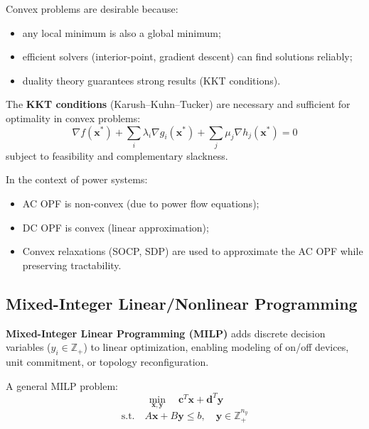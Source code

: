 \documentclass[11pt]{article}
\begin{document}
	
	Convex problems are desirable because:
	\begin{itemize}
		\item any local minimum is also a global minimum;
		\item efficient solvers (interior-point, gradient descent) can find solutions reliably;
		\item duality theory guarantees strong results (KKT conditions).
	\end{itemize}
	
	
	The \textbf{KKT conditions} (Karush–Kuhn–Tucker) are necessary and sufficient for optimality in convex problems:
	\[
	\nabla f(\mathbf{x}^*) + \sum_i \lambda_i \nabla g_i(\mathbf{x}^*) + \sum_j \mu_j \nabla h_j(\mathbf{x}^*) = 0
	\]
	subject to feasibility and complementary slackness.
	
	In the context of power systems:
	\begin{itemize}
		\item AC OPF is non-convex (due to power flow equations);
		\item DC OPF is convex (linear approximation);
		\item Convex relaxations (SOCP, SDP) are used to approximate the AC OPF while preserving tractability.
	\end{itemize}
	
	\subsection{Mixed-Integer Linear/Nonlinear Programming}
	
	\textbf{Mixed-Integer Linear Programming (MILP)} adds discrete decision variables ($y_i \in \mathbb{Z}_+$) to linear optimization, enabling modeling of on/off devices, unit commitment, or topology reconfiguration.
	
	A general MILP problem:
	\[
	\min_{\mathbf{x},\mathbf{y}} \quad \mathbf{c}^T \mathbf{x} + \mathbf{d}^T \mathbf{y}
	\]
	\[
	\text{s.t.} \quad A \mathbf{x} + B \mathbf{y} \le b, \quad \mathbf{y} \in \mathbb{Z}^{n_y}_+
	\]
	
\end{document}
